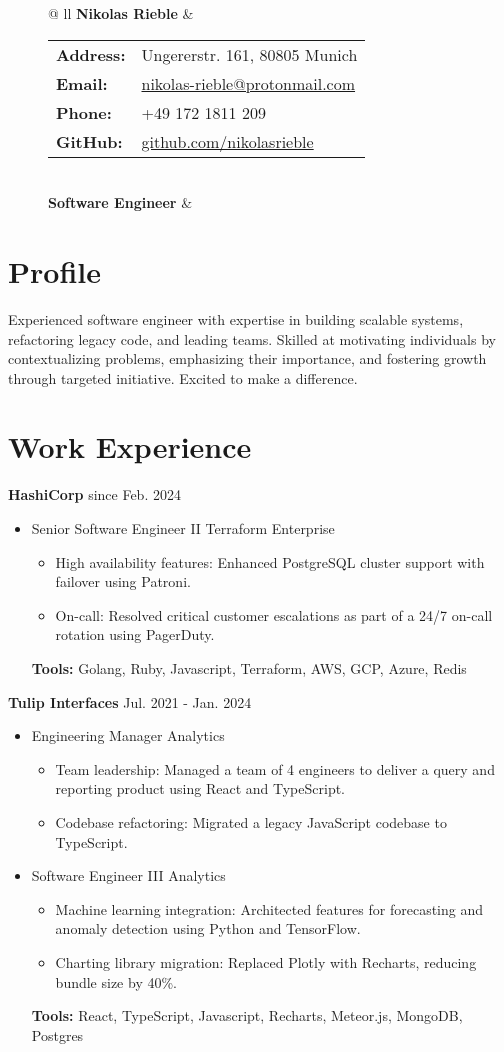 \documentclass[letterpaper,11pt]{article}
\newcommand{\roleSpacing}{\vspace{4pt}}
\newcommand{\role}[2]{\item{#1 \hfill #2 \\}} %
\newcommand{\station}[2]{\textbf{#1}  \hfill #2 \\} %
\newcommand{\project}[2]{\item\small{#1: #2}} %
\newcommand{\resumeSubHeadingListStart}{\begin{itemize}[leftmargin=*]}
\newcommand{\resumeSubHeadingListEnd}{\end{itemize}}
\newcommand{\projectliststart}{\begin{itemize}[leftmargin=*] \vspace{-5pt} }
\newcommand{\projectlistend}{\end{itemize}\vspace{-5pt}}
\begin{document}
\addtolength{\tabcolsep}{4pt}    %
{\renewcommand{\arraystretch}{1} %
\begin{figure}[t]
	\centering
	\begin{tabular*}{\textwidth}{@{\extracolsep{\fill}} ll}
		 \textbf{{\Huge Nikolas Rieble}} & 
		\begin{tabular}{@{}ll@{}}
			\textbf{Address:} & Ungererstr. 161, 80805 Munich \\
			\textbf{Email:} & \href{mailto:nikolas-rieble@protonmail.com}{nikolas-rieble@protonmail.com} \\
			\textbf{Phone:} & +49 172 1811 209 \\
			\textbf{GitHub:} & \href{https://github.com/nikolasrieble}{github.com/nikolasrieble} \\
		\end{tabular} \\
		\textbf{Software Engineer} & \\
	\end{tabular*}
\end{figure}
}

\section{Profile}
Experienced software engineer with expertise in building scalable systems, refactoring legacy code, and leading teams. Skilled at motivating individuals by contextualizing problems, emphasizing their importance, and fostering growth through targeted initiative. Excited to make a difference.

\section{Work Experience}

\station{HashiCorp}{since Feb. 2024}
\resumeSubHeadingListStart
\role{Senior Software Engineer II}{Terraform Enterprise}
\projectliststart
\project{High availability features}{Enhanced PostgreSQL cluster support with failover using Patroni.}
\project{On-call}{Resolved critical customer escalations as part of a 24/7 on-call rotation using PagerDuty.}
\projectlistend
\textbf{Tools:} Golang, Ruby, Javascript, Terraform, AWS, GCP, Azure, Redis
\resumeSubHeadingListEnd
\roleSpacing
\station{Tulip Interfaces}{Jul. 2021 - Jan. 2024}
\resumeSubHeadingListStart
\role{Engineering Manager}{Analytics}
\projectliststart
\project{Team leadership}{Managed a team of 4 engineers to deliver a query and reporting product using React and TypeScript.}
\project{Codebase refactoring}{Migrated a legacy JavaScript codebase to TypeScript.}
\projectlistend
\roleSpacing
\role{Software Engineer III}{Analytics}
\projectliststart
\project{Machine learning integration}{Architected features for forecasting and anomaly detection using Python and TensorFlow.}
\project{Charting library migration}{Replaced Plotly with Recharts, reducing bundle size by 40\%.}
\projectlistend
\textbf{Tools:} React, TypeScript, Javascript, Recharts, Meteor.js, MongoDB, Postgres
\resumeSubHeadingListEnd
\end{document}
